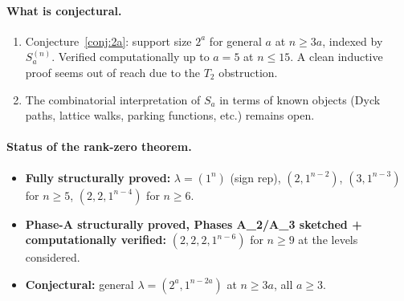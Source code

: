 \documentclass[11pt]{article}
\theoremstyle{definition}
\begin{document}
\paragraph{What is conjectural.}
\begin{enumerate}[leftmargin=2em,topsep=0.3em,itemsep=0.2em]
\item Conjecture~\ref{conj:2a}: support size $2^a$ for general
$a$ at $n\ge 3a$, indexed by $S_a^{(n)}$.  Verified
computationally up to $a=5$ at $n\le 15$.  A clean inductive
proof seems out of reach due to the $T_2$ obstruction.
\item The combinatorial interpretation of $S_a$ in terms of
known objects (Dyck paths, lattice walks, parking functions,
etc.) remains open.
\end{enumerate}

\paragraph{Status of the rank-zero theorem.}
\begin{itemize}[leftmargin=2em,topsep=0.3em,itemsep=0.2em]
\item \textbf{Fully structurally proved:} $\lambda=(1^n)$
(sign rep), $(2,1^{n-2})$, $(3,1^{n-3})$ for $n\ge 5$,
$(2,2,1^{n-4})$ for $n\ge 6$.
\item \textbf{Phase-A structurally proved, Phases A_2/A_3
sketched + computationally verified:} $(2,2,2,1^{n-6})$ for
$n\ge 9$ at the levels considered.
\item \textbf{Conjectural:} general $\lambda=(2^a,1^{n-2a})$ at
$n\ge 3a$, all $a\ge 3$.
\end{itemize}
\end{document}
